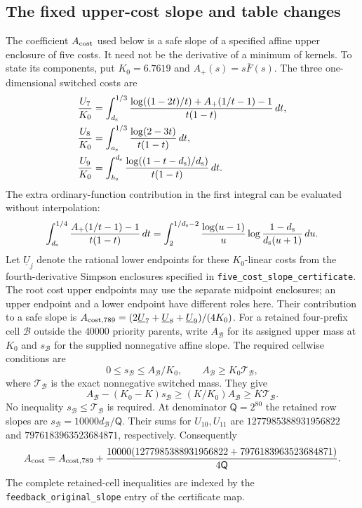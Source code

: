 \subsection{The fixed upper-cost slope and table changes}
\label{num:cost-slope}
The coefficient $A_{\rm cost}$ used below is a safe slope of a specified affine
upper enclosure of five costs. It need not be the derivative of a
minimum of kernels. To state its components, put $K_0=6.7619$ and
$A_+(s)=s\overline F(s)$. The three one-dimensional switched
costs are
\begin{align*}
 \frac{U_7}{K_0}&=\int_{d_{\rm s}}^{1/3}
  \frac{\log((1-2t)/t)+A_+(1/t-1)-1}{t(1-t)}\,dt,\\
 \frac{U_8}{K_0}&=\int_{a_{\rm s}}^{1/3}\frac{\log(2-3t)}{t(1-t)}\,dt,\\
 \frac{U_9}{K_0}&=\int_{h_{\rm s}}^{d_{\rm s}}\frac{\log((1-t-{d_{\rm s}})/{d_{\rm s}})}{t(1-t)}\,dt.
\end{align*}
The extra ordinary-function contribution in the first integral can
be evaluated without interpolation:
\[
 \int_{d_{\rm s}}^{1/4}\frac{A_+(1/t-1)-1}{t(1-t)}\,dt
 =\int_2^{1/{d_{\rm s}}-2}\frac{\log(u-1)}u
                  \log\frac{1-{d_{\rm s}}}{{d_{\rm s}}(u+1)}\,du.
\]
Let $\underline U_j$ denote the rational lower endpoints for these
$K_0$-linear costs from the fourth-derivative Simpson enclosures
specified in \texttt{five\_cost\_slope\_certificate}. The root cost
upper endpoints may use the separate midpoint enclosures; an upper
endpoint and a lower endpoint have different roles here.
Their contribution to a safe slope is
$A_{{\rm cost},789}=(2\underline U_7+\underline U_8+\underline U_9)/(4K_0)$.
For a retained four-prefix cell $\mathscr B$ outside the $40000$ priority
parents, write $A_{\mathscr B}$ for its assigned upper mass at $K_0$ and $s_{\mathscr B}$
for the supplied nonnegative affine slope. The required cellwise
conditions are
\begin{equation}
 0\le s_{\mathscr B}\le A_{\mathscr B}/K_0,\qquad A_{\mathscr B}\ge K_0\mathcal T_{\mathscr B},
 \label{num:affine-majorant-slope}
\end{equation}
where $\mathcal T_{\mathscr B}$ is the exact nonnegative switched mass. They give
\[
 A_{\mathscr B}-(K_0-K)s_{\mathscr B}\ge(K/K_0)A_{\mathscr B}\ge K\mathcal T_{\mathscr B}.
\]
No inequality $s_{\mathscr B}\le\mathcal T_{\mathscr B}$ is required.
At denominator $\mathsf Q=2^{80}$ the retained row slopes are
$s_{\mathscr B}=10000d_{\mathscr B}/\mathsf Q$. Their sums for $U_{10},U_{11}$ are
$1277985388931956822$ and $7976183963523684871$, respectively.
Consequently
\begin{equation}
 A_{\rm cost}=A_{{\rm cost},789}+
 \frac{10000(1277985388931956822+7976183963523684871)}{4\mathsf Q}.
 \label{num:five-cost-slope}
\end{equation}
The complete retained-cell inequalities are indexed by the
\texttt{feedback\_original\_slope} entry of the certificate map.

